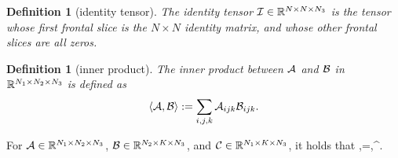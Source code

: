 \documentclass[11pt]{article}
\newtheorem{definition}[theorem]{Definition}
\begin{document}
\begin{definition}[identity tensor]
 The identity tensor $\mathcal I\in\mathbb R^{N\times N\times N_3}$ is the tensor whose first frontal slice is the $N\times N$ identity matrix, and whose other frontal slices are all zeros.	
\end{definition}

\begin{definition}[inner product]
The inner product between $\mathcal A$ and $\mathcal B$ in $\mathbb R^{N_1\times N_2\times N_3}$ is defined as $$\langle\mathcal A,\mathcal B\rangle:=\sum_{i,j,k}\mathcal A_{ijk}\mathcal B_{ijk}.$$ 
\end{definition}

For $\mathcal A\in\mathbb R^{N_1\times N_2\times N_3}$, $\mathcal B\in\mathbb R^{N_2\times K\times N_3}$, and $\mathcal C\in\mathbb R^{N_1\times K\times N_3}$, it holds that \beq\label{tran}\la\mcala*\mcalb,\mcalc\ra=\la\mcalb,\mcala^\top*\mcalc\ra.\eeq
\end{document}
